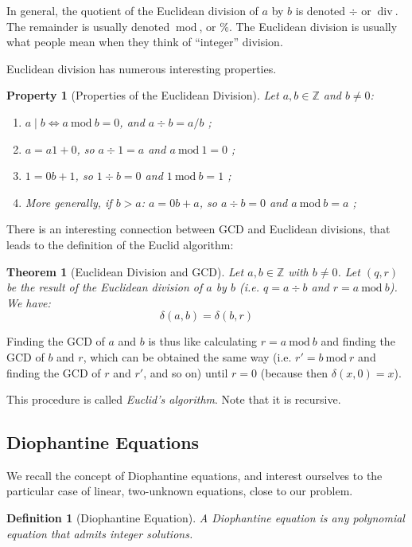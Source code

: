 \documentclass{article}
\newtheorem{definition}{Definition}
\newtheorem{theorem}{Theorem}
\newtheorem{property}{Property}
\newcommand{\divi}{\mathbin{\mid}}
\newcommand{\tdiv}{\mathbin{~\mathrm{div}~}}
\newcommand{\tmod}{\mathbin{~\mathrm{mod}~}}
\begin{document}
In general, the quotient of the Euclidean division of $a$ by $b$ is denoted $\div$ or $\tdiv$. The remainder is usually denoted $\tmod$, or $\%$. The Euclidean division is usually what people mean when they think of ``integer'' division.

Euclidean division has numerous interesting properties.

\begin{property}[Properties of the Euclidean Division]
Let $a,b \in \mathbb{Z}$ and $b \neq 0$:
\begin{enumerate}
\item $a \divi b \Leftrightarrow a \tmod b = 0$, and $a \div b = a / b$ ;
\item $a = a 1 + 0$, so $a \div 1 = a$ and $a \tmod 1 = 0$ ;
\item $1 = 0 b + 1$, so $1 \div b = 0$ and $1 \tmod b = 1$ ;
\item More generally, if $b > a$: $a = 0 b + a$, so $a \div b = 0$ and $a \tmod b = a$ ;
\end{enumerate}
\end{property}

There is an interesting connection between GCD and Euclidean divisions, that leads to the definition of the Euclid algorithm:

\begin{theorem}[Euclidean Division and GCD]
Let $a,b \in \mathbb{Z}$ with $b \neq 0$. Let $(q,r)$ be the result of the Euclidean division of $a$ by $b$ (i.e. $q = a \div b$ and $r = a \tmod b$). We have:
$$\delta(a,b) = \delta(b,r)$$
\end{theorem}

Finding the GCD of $a$ and $b$ is thus like calculating $r = a \tmod b$ and finding the GCD of $b$ and $r$, which can be obtained the same way (i.e. $r' = b \tmod r$ and finding the GCD of $r$ and $r'$, and so on) until $r = 0$ (because then $\delta(x,0) = x$).

This procedure is called \textit{Euclid's algorithm}. Note that it is recursive.



\subsection{Diophantine Equations}

We recall the concept of Diophantine equations, and interest ourselves to the particular case of linear, two-unknown equations, close to our problem.

\begin{definition}[Diophantine Equation]
A Diophantine equation is any polynomial equation that admits integer solutions.
\end{definition}
\end{document}
